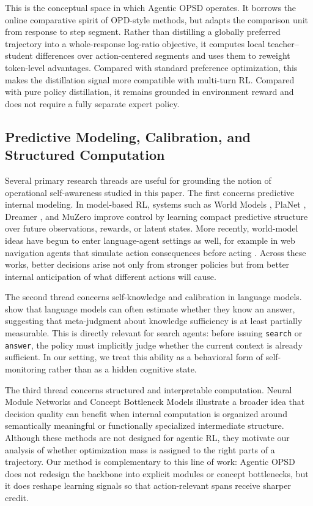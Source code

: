 \documentclass[11pt]{article}
\newcommand{\method}{Agentic OPSD}
\begin{document}
This is the conceptual space in which \method{} operates. It borrows the online comparative spirit of OPD-style methods, but adapts the comparison unit from response to step segment. Rather than distilling a globally preferred trajectory into a whole-response log-ratio objective, it computes local teacher--student differences over action-centered segments and uses them to reweight token-level advantages. Compared with standard preference optimization, this makes the distillation signal more compatible with multi-turn RL. Compared with pure policy distillation, it remains grounded in environment reward and does not require a fully separate expert policy.

\subsection{Predictive Modeling, Calibration, and Structured Computation}
Several primary research threads are useful for grounding the notion of operational self-awareness studied in this paper. The first concerns predictive internal modeling. In model-based RL, systems such as World Models \citep{ha2018worldmodels}, PlaNet \citep{hafner2019planet}, Dreamer \citep{hafner2020dreamer}, and MuZero \citep{schrittwieser2020muzero} improve control by learning compact predictive structure over future observations, rewards, or latent states. More recently, world-model ideas have begun to enter language-agent settings as well, for example in web navigation agents that simulate action consequences before acting \citep{chae2024web}. Across these works, better decisions arise not only from stronger policies but from better internal anticipation of what different actions will cause.

The second thread concerns self-knowledge and calibration in language models. \citet{kadavath2022know} show that language models can often estimate whether they know an answer, suggesting that meta-judgment about knowledge sufficiency is at least partially measurable. This is directly relevant for search agents: before issuing \texttt{search} or \texttt{answer}, the policy must implicitly judge whether the current context is already sufficient. In our setting, we treat this ability as a behavioral form of self-monitoring rather than as a hidden cognitive state.

The third thread concerns structured and interpretable computation. Neural Module Networks \citep{andreas2016nmn} and Concept Bottleneck Models \citep{koh2020cbm} illustrate a broader idea that decision quality can benefit when internal computation is organized around semantically meaningful or functionally specialized intermediate structure. Although these methods are not designed for agentic RL, they motivate our analysis of whether optimization mass is assigned to the right parts of a trajectory. Our method is complementary to this line of work: \method{} does not redesign the backbone into explicit modules or concept bottlenecks, but it does reshape learning signals so that action-relevant spans receive sharper credit.
\end{document}
